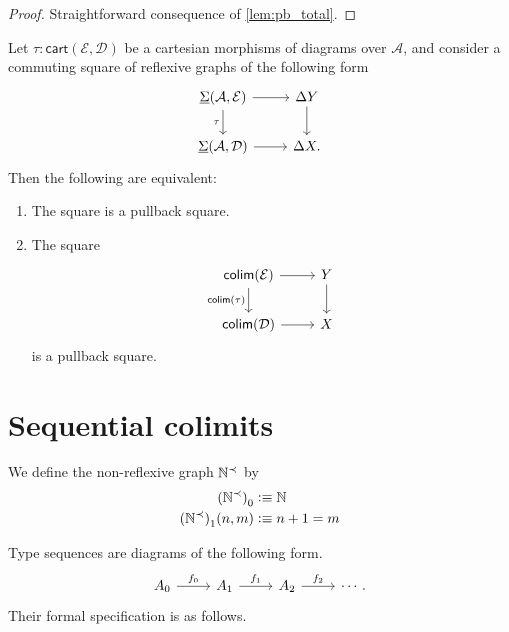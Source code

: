 \begin{proof}
Straightforward consequence of \cref{lem:pb_total}.
\end{proof}

\begin{thm}
Let $\tau:\mathsf{cart}(\mathcal{E},\mathcal{D})$ be a cartesian morphisms of diagrams over $\mathcal{A}$, and consider a commuting square of reflexive graphs of the following form
\begin{equation*}
\begin{tikzcd}
\msm{\mathcal{A}}{\mathcal{E}} \arrow[d,swap,"\tau"] \arrow[r] & \Delta Y \arrow[d] \\
\msm{\mathcal{A}}{\mathcal{D}} \arrow[r] & \Delta X.
\end{tikzcd}
\end{equation*}
Then the following are equivalent:
\begin{enumerate}
\item The square is a pullback square.
\item The square
\begin{equation*}
\begin{tikzcd}
\mathsf{colim}(\mathcal{E}) \arrow[r] \arrow[d,swap,"\mathsf{colim}(\tau)"] & Y \arrow[d] \\
\mathsf{colim}(\mathcal{D}) \arrow[r] & X
\end{tikzcd}
\end{equation*}
is a pullback square.
\end{enumerate}
\end{thm}

\section{Sequential colimits}

\begin{defn}
We define the non-reflexive graph $\mathbb{N}^{\prec}$ by 
\begin{align*}
\pts{(\N^{\prec})} & \defeq \N \\
\edg{(\N^{\prec})}(n,m) & \defeq n+1=m \\
\end{align*}
\end{defn}

Type sequences are diagrams of the following form.
\begin{equation*}
\begin{tikzcd}
A_0 \arrow[r,"f_0"] & A_1 \arrow[r,"f_1"] & A_2 \arrow[r,"f_2"] & \cdots.
\end{tikzcd}
\end{equation*}
Their formal specification is as follows.

